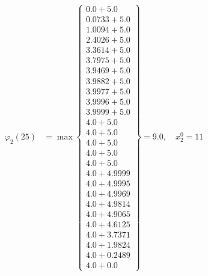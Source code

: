 \documentclass{article}
\begin{document}
\begin{align*}
  
  
  
\varphi_{2}(25) &= \max \left\{ \begin{array}{c}
0.0 + 5.0 \\
 0.0733 + 5.0 \\
 1.0094 + 5.0 \\
 2.4026 + 5.0 \\
 3.3614 + 5.0 \\
 3.7975 + 5.0 \\
 3.9469 + 5.0 \\
 3.9882 + 5.0 \\
 3.9977 + 5.0 \\
 3.9996 + 5.0 \\
 3.9999 + 5.0 \\
 4.0 + 5.0 \\
 4.0 + 5.0 \\
 4.0 + 5.0 \\
 4.0 + 5.0 \\
 4.0 + 5.0 \\
 4.0 + 4.9999 \\
 4.0 + 4.9995 \\
 4.0 + 4.9969 \\
 4.0 + 4.9814 \\
 4.0 + 4.9065 \\
 4.0 + 4.6125 \\
 4.0 + 3.7371 \\
 4.0 + 1.9824 \\
 4.0 + 0.2489 \\
 4.0 + 0.0
\end{array} \right\}=9.0,\quad x_{2}^0=11\\
  
  
  

\end{align*}
\end{document}
